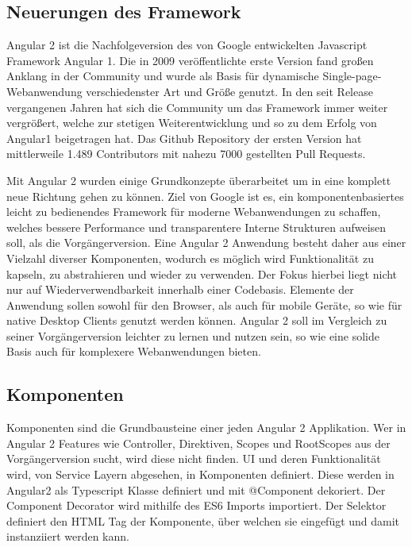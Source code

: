 \subsection{Neuerungen des Framework}

Angular 2 ist die Nachfolgeversion des von Google entwickelten Javascript Framework Angular 1.
Die in 2009 veröffentlichte erste Version fand großen Anklang in der Community
und wurde als Basis für dynamische Single-page-Webanwendung verschiedenster Art und Größe genutzt.
In den seit Release vergangenen Jahren hat sich die Community um das Framework immer weiter vergrößert,
welche zur stetigen Weiterentwicklung und so zu dem Erfolg von Angular1 beigetragen hat.
Das Github Repository der ersten Version hat mittlerweile 1.489 Contributors mit nahezu 7000 gestellten Pull Requests. \cite{ng1-github}

Mit Angular 2 wurden einige Grundkonzepte überarbeitet um in eine komplett neue Richtung gehen zu können.
Ziel von Google ist es, ein komponentenbasiertes leicht zu bedienendes Framework für moderne
Webanwendungen zu schaffen, welches bessere Performance und transparentere Interne Strukturen aufweisen soll, als die Vorgängerversion.
Eine Angular 2 Anwendung besteht daher aus einer Vielzahl diverser Komponenten, wodurch es möglich wird
Funktionalität zu kapseln, zu abstrahieren und wieder zu verwenden. Der Fokus hierbei liegt nicht nur auf Wiederverwendbarkeit innerhalb einer Codebasis.
Elemente der Anwendung sollen sowohl für den Browser, als auch für mobile Geräte, so wie für native Desktop Clients genutzt werden können.
Angular 2 soll im Vergleich zu seiner Vorgängerversion leichter zu lernen und nutzen sein,
so wie eine solide Basis auch für komplexere Webanwendungen bieten. \cite[11-12]{Angular2}


\subsection{Komponenten}

Komponenten sind die Grundbausteine einer jeden Angular 2 Applikation.
Wer in Angular 2 Features wie Controller, Direktiven, Scopes und RootScopes aus der Vorgängerversion sucht,
wird diese nicht finden. UI und deren Funktionalität wird, von Service Layern abgesehen, in Komponenten definiert.
Diese werden in Angular2 als Typescript Klasse definiert und mit @Component dekoriert.
Der Component Decorator wird mithilfe des ES6 Imports importiert.
Der Selektor definiert den HTML Tag der Komponente, über welchen sie eingefügt und damit instanziiert werden kann.


